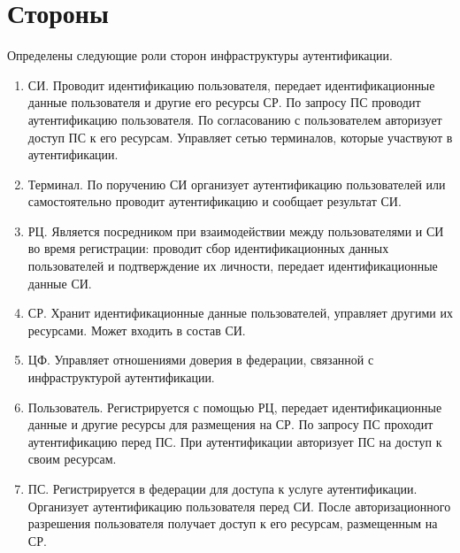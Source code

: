 \section{Стороны}\label{COMMON.Entities}

Определены следующие роли сторон инфраструктуры аутентификации.

\begin{enumerate}
\item
СИ. Проводит идентификацию пользователя, передает идентификационные данные 
пользователя и другие его ресурсы СР. 
%
По запросу ПС проводит аутентификацию пользователя.
%
По согласованию с пользователем авторизует доступ ПС к его ресурсам.
%
Управляет сетью терминалов, которые участвуют в аутентификации.

\item
Терминал. По поручению СИ организует аутентификацию пользователей
или самостоятельно проводит аутентификацию и сообщает результат СИ. 

\item
РЦ. Является посредником при взаимодействии между пользователями и СИ во время 
регистрации: проводит сбор идентификационных данных пользователей и подтверждение
их личности, передает идентификационные данные СИ. 

\item
СР. Хранит идентификационные данные пользователей, управляет другими 
их ресурсами. Может входить в состав СИ.

\item
ЦФ. Управляет отношениями доверия в федерации, связанной с инфраструктурой
аутентификации.

\item
Пользователь. Регистрируется с помощью РЦ, передает идентификационные данные и 
другие ресурсы для размещения на СР. По запросу ПС проходит аутентификацию 
перед ПС. При аутентификации авторизует ПС на доступ к своим ресурсам.

%

\item
ПС. Регистрируется в федерации для доступа к услуге аутентификации.
Организует аутентификацию пользователя перед СИ. После авторизационного
разрешения пользователя получает доступ к его ресурсам, размещенным на СР.
\end{enumerate}


